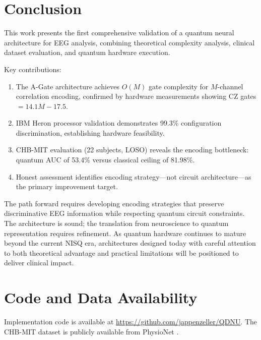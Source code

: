 \documentclass[11pt,a4paper]{article}
\begin{document}
\section{Conclusion}

This work presents the first comprehensive validation of a quantum neural architecture for EEG analysis, combining theoretical complexity analysis, clinical dataset evaluation, and quantum hardware execution.

Key contributions:
\begin{enumerate}
    \item The A-Gate architecture achieves $O(M)$ gate complexity for $M$-channel correlation encoding, confirmed by hardware measurements showing CZ gates $= 14.1M - 17.5$.
    \item IBM Heron processor validation demonstrates 99.3\% configuration discrimination, establishing hardware feasibility.
    \item CHB-MIT evaluation (22 subjects, LOSO) reveals the encoding bottleneck: quantum AUC of 53.4\% versus classical ceiling of 81.98\%.
    \item Honest assessment identifies encoding strategy---not circuit architecture---as the primary improvement target.
\end{enumerate}

The path forward requires developing encoding strategies that preserve discriminative EEG information while respecting quantum circuit constraints. The architecture is sound; the translation from neuroscience to quantum representation requires refinement. As quantum hardware continues to mature beyond the current NISQ era, architectures designed today with careful attention to both theoretical advantage and practical limitations will be positioned to deliver clinical impact.

\section*{Code and Data Availability}

Implementation code is available at \url{https://github.com/jappenzeller/QDNU}. The CHB-MIT dataset is publicly available from PhysioNet \citep{goldberger2000}.
\end{document}
